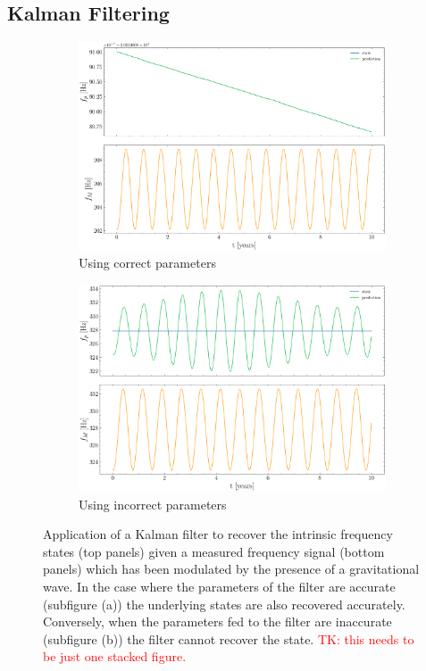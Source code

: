 \documentclass[fleqn,usenatbib,useAMS]{mnras}
\begin{document}
\subsection{Kalman Filtering}\label{sec:kalman_filter}
\begin{figure}
	\begin{subfigure}[b]{1\columnwidth}
		\includegraphics[width=\textwidth]{images/KF1}
		\caption{Using correct parameters}
		\label{fig:6MB_BFS}
	\end{subfigure}
	\hfill
	\begin{subfigure}[b]{1\columnwidth}
		\includegraphics[width=\textwidth]{images/KF2}
		\caption{Using incorrect parameters}
		\label{fig:25MB_bfs}
	\end{subfigure}
	\caption{Application of a Kalman filter to recover the intrinsic frequency states (top panels) given a measured frequency signal (bottom panels) which has been modulated by the presence of a gravitational wave. In the case where the parameters of the filter are accurate (subfigure (a)) the underlying states are also recovered accurately. Conversely, when the parameters fed to the filter are inaccurate (subfigure (b)) the filter cannot recover the state. \textcolor{red}{TK: this needs to be just one stacked figure.}}
	\label{fig:four figures}
\end{figure}
\end{document}
